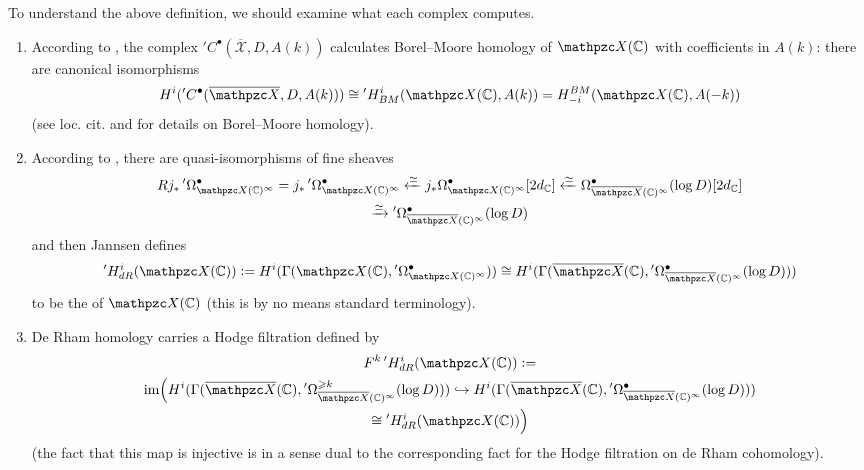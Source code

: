 \vspace{1em}

To understand the above definition, we should examine what each complex
computes.

\begin{enumerate}
\item According to \cite[Lemma 1.11]{Jannsen-Homology}, the complex
  ${}' C^\bullet (\overline{\mathcal{X}}, D, A (k))$ calculates Borel--Moore
  homology of $\mathcal{X} (\CC)$ with coefficients in $A (k)$: there are
  canonical isomorphisms
  \[ H^i ({}' C^\bullet (\overline{\mathcal{X}}, D, A (k))) \isom
    {}' H^i_{BM} (\mathcal{X} (\CC), A (k)) =
    H_{-i}^{BM} (\mathcal{X} (\CC), A (-k)) \]
  (see loc. cit. and \cite[\S 1]{Verdier-Classe} for details on Borel--Moore
  homology).

\item According to \cite[Corollary 1.13]{Jannsen-Homology}, there are
  quasi-isomorphisms of fine sheaves
  \begin{multline*}
    R j_* \, {}' \Omega_{\mathcal{X} (\CC)^\infty}^\bullet =
    j_* \, {}' \Omega_{\mathcal{X} (\CC)^\infty}^\bullet \xleftarrow{\quiso}
    j_* \Omega_{\mathcal{X} (\CC)^\infty}^\bullet [2d_\CC] \xleftarrow{\quiso}
    \Omega_{\overline{\mathcal{X}} (\CC)^\infty}^\bullet (\log D) [2d_\CC] \\
    \xrightarrow{\quiso}
    {}' \Omega_{\overline{\mathcal{X}} (\CC)^\infty}^\bullet (\log D)
  \end{multline*}
  and then Jannsen defines
  \[ {}' H^i_{dR} (\mathcal{X} (\CC)) \dfn
    H^i (\Gamma (\mathcal{X} (\CC), {}' \Omega_{\mathcal{X} (\CC)^\infty}^\bullet)) \isom
    H^i (\Gamma (\overline{\mathcal{X}} (\CC), {}' \Omega_{\overline{\mathcal{X}} (\CC)^\infty}^\bullet (\log D))) \]
  to be the  of $\mathcal{X} (\CC)$ (this is by no means
  standard terminology).

\item De Rham homology carries a Hodge filtration defined by
  \begin{multline*}
    F^k \, {}' H^i_{dR} (\mathcal{X} (\CC)) \dfn \\
    \im \Bigl(
    H^i (\Gamma (\overline{\mathcal{X}} (\CC), {}' \Omega_{\overline{\mathcal{X}} (\CC)^\infty}^{\geqslant k} (\log D)))
    \hookrightarrow
    H^i (\Gamma (\overline{\mathcal{X}} (\CC), {}' \Omega_{\overline{\mathcal{X}} (\CC)^\infty}^\bullet (\log D))) \\
    \isom {}' H^i_{dR} (\mathcal{X} (\CC))
    \Bigr)
  \end{multline*}
  (the fact that this map is injective is in a sense dual to the corresponding
  fact for the Hodge filtration on de Rham cohomology).
\end{enumerate}

